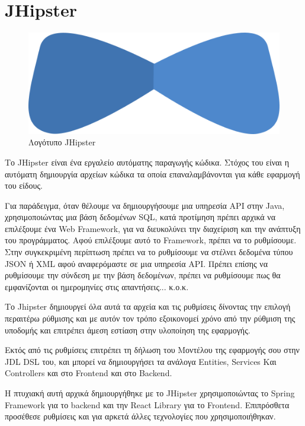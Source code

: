\section{JHipster}

\begin{figure}[h]
  \centering
  \includegraphics[]{Chapters/3 - Technologies/Images/jhipster-logo.png}
  \caption{Λογότυπο JHipster}
  \label{fig:jhipster-logo}
\end{figure}

Το JHipster είναι ένα εργαλείο αυτόματης παραγωγής κώδικα. Στόχος του είναι η αυτόματη δημιουργία αρχείων κώδικα τα οποία επαναλαμβάνονται για κάθε εφαρμογή του είδους.

Για παράδειγμα, όταν θέλουμε να δημιουργήσουμε μια υπηρεσία API στην Java, χρησιμοποιώντας μια βάση δεδομένων SQL, κατά προτίμηση
πρέπει αρχικά να επιλέξουμε ένα Web Framework, για να διευκολύνει την διαχείριση και την ανάπτυξη του προγράμματος. Αφού επιλέξουμε αυτό το Framework, πρέπει να το ρυθμίσουμε. Στην συγκεκριμένη περίπτωση πρέπει να το ρυθμίσουμε να στέλνει δεδομένα τύπου JSON ή XML αφού αναφερόμαστε σε μια υπηρεσία API. Πρέπει επίσης να ρυθμίσουμε την σύνδεση με την βάση δεδομένων, πρέπει να ρυθμίσουμε πως θα εμφανίζονται οι ημερομηνίες στις απαντήσεις... κ.ο.κ. 

Το Jhipster δημιουργεί όλα αυτά τα αρχεία και τις ρυθμίσεις δίνοντας την επιλογή περαιτέρω ρύθμισης και με αυτόν τον τρόπο εξοικονομεί
χρόνο από την ρύθμιση της υποδομής και επιτρέπει άμεση εστίαση
στην υλοποίηση της εφαρμογής. 

Εκτός από τις ρυθμίσεις επιτρέπει τη δήλωση του Μοντέλου
της εφαρμογής σου στην JDL DSL του, και μπορεί να δημιουργήσει τα ανάλογα Entities, Services Και Controllers και στο Frontend και στο Backend.

Η πτυχιακή αυτή αρχικά δημιουργήθηκε με το JHipster χρησιμοποιώντας το Spring Framework για το backend και την React Library για το Frontend. Επιπρόσθετα προσέθεσε ρυθμίσεις και για αρκετά άλλες τεχνολογίες που χρησιμοποιήθηκαν.

